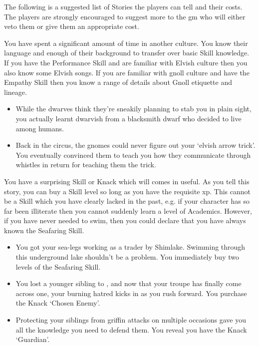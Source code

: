 \begin{multicols}{2}

\noindent
The following is a suggested list of Stories the players can tell and their costs.
The players are strongly encouraged to suggest more to the \gls{gm} who will either veto them or give them an appropriate cost.

You have spent a significant amount of time in another culture.
You know their language and enough of their background to transfer over basic Skill knowledge.
If you have the Performance Skill and are familiar with Elvish culture then you also know some Elvish songs.
If you are familiar with gnoll culture and have the Empathy Skill then you know a range of details about Gnoll etiquette and lineage.

\begin{itemize}
\item While the dwarves think they're sneakily planning to stab you in plain sight, you actually learnt dwarvish from a blacksmith dwarf who decided to live among humans.
\item Back in the circus, the gnomes could never figure out your `elvish arrow trick'.
You eventually convinced them to teach you how they communicate through whistles in return for teaching them the trick.
\end{itemize}

\label{surpriseSkill}
You have a surprising Skill or Knack which will comes in useful.
As you tell this story, you can buy a Skill level so long as you have the requisite \gls{xp}.
This cannot be a Skill which you have clearly lacked in the past, e.g. if your character has so far been illiterate then you cannot suddenly learn a level of Academics.
However, if you have never needed to swim, then you could declare that you have always known the Seafaring Skill.

\begin{itemize}
  \item
  You got your sea-legs working as a trader by Shimlake.
  Swimming through this underground lake shouldn't be a problem.
  You immediately buy two levels of the Seafaring Skill.
  \item
  You lost a younger sibling to , and now that your troupe has finally come across one, your burning hatred kicks in as you rush forward.
  You purchase the Knack `Chosen Enemy'.
  \item
  Protecting your siblings from griffin attacks on multiple occasions gave you all the knowledge you need to defend them.
  You reveal you have the Knack `Guardian'.
\end{itemize}


\end{multicols}
